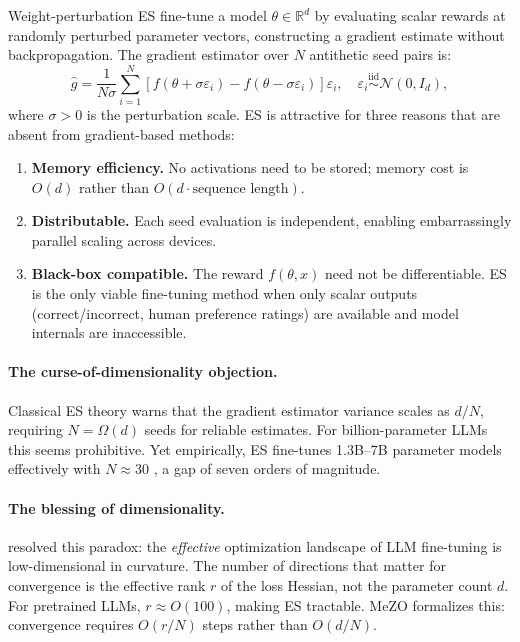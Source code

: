\documentclass[11pt]{article}
\theoremstyle{definition}
\theoremstyle{remark}
\newcommand{\R}{\mathbb{R}}
\begin{document}
Weight-perturbation ES fine-tune a model $\theta \in \R^d$ by evaluating scalar rewards at randomly perturbed parameter vectors, constructing a gradient estimate without backpropagation. The gradient estimator over $N$ antithetic seed pairs is:
\begin{equation}
  \hat{g} = \frac{1}{N\sigma}\sum_{i=1}^{N}\left[f(\theta+\sigma\varepsilon_i) - f(\theta-\sigma\varepsilon_i)\right]\varepsilon_i,
  \quad \varepsilon_i \overset{\mathrm{iid}}{\sim} \mathcal{N}(0,I_d),
  \label{eq:es-estimator}
\end{equation}
where $\sigma > 0$ is the perturbation scale. ES is attractive for three reasons that are absent from gradient-based methods:
\begin{enumerate}[leftmargin=*]
  \item \textbf{Memory efficiency.} No activations need to be stored; memory cost is $O(d)$ rather than $O(d \cdot \text{sequence length})$.
  \item \textbf{Distributable.} Each seed evaluation is independent, enabling embarrassingly parallel scaling across devices.
  \item \textbf{Black-box compatible.} The reward $f(\theta, x)$ need not be differentiable. ES is the only viable fine-tuning method when only scalar outputs (correct/incorrect, human preference ratings) are available and model internals are inaccessible.
\end{enumerate}

\paragraph{The curse-of-dimensionality objection.}
Classical ES theory warns that the gradient estimator variance scales as $d/N$, requiring $N = \Omega(d)$ seeds for reliable estimates. For billion-parameter LLMs this seems prohibitive. Yet empirically, ES fine-tunes 1.3B--7B parameter models effectively with $N \approx 30$ \citep{qiu2024esscale,liang2026blessing}, a gap of seven orders of magnitude.

\paragraph{The blessing of dimensionality.}
\citet{liang2026blessing} resolved this paradox: the \emph{effective} optimization landscape of LLM fine-tuning is low-dimensional in curvature. The number of directions that matter for convergence is the effective rank $r$ of the loss Hessian, not the parameter count $d$. For pretrained LLMs, $r \approx O(100)$, making ES tractable. MeZO \citep{malladi2023mezo} formalizes this: convergence requires $O(r/N)$ steps rather than $O(d/N)$.
\end{document}
